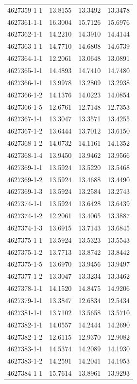\begin{longtable}{lrrr}
4627359-1-1 & 13.8155 & 13.3492 & 13.3478 \\
4627361-1-1 & 16.3004 & 15.7126 & 15.6976 \\
4627362-1-1 & 14.2210 & 14.3910 & 14.4144 \\
4627363-1-1 & 14.7710 & 14.6808 & 14.6739 \\
4627364-1-1 & 12.2061 & 13.0648 & 13.0891 \\
4627365-1-1 & 14.4893 & 14.7410 & 14.7480 \\
4627366-1-1 & 13.9978 & 13.2809 & 13.2938 \\
4627366-1-2 & 14.1376 & 14.0223 & 14.0854 \\
4627366-1-5 & 12.6761 & 12.7148 & 12.7353 \\
4627367-1-1 & 13.3047 & 13.3571 & 13.4255 \\
4627367-1-2 & 13.6444 & 13.7012 & 13.6150 \\
4627368-1-2 & 14.0732 & 14.1161 & 14.1352 \\
4627368-1-4 & 13.9450 & 13.9462 & 13.9566 \\
4627369-1-1 & 13.5924 & 13.5220 & 13.5468 \\
4627369-1-2 & 13.5924 & 13.4688 & 13.4490 \\
4627369-1-3 & 13.5924 & 13.2584 & 13.2743 \\
4627374-1-1 & 13.5924 & 13.6428 & 13.6439 \\
4627374-1-2 & 12.2061 & 13.4065 & 13.3887 \\
4627374-1-3 & 13.6915 & 13.7143 & 13.6845 \\
4627375-1-1 & 13.5924 & 13.5323 & 13.5543 \\
4627375-1-2 & 13.7713 & 13.8742 & 13.8442 \\
4627375-1-5 & 13.6970 & 13.9456 & 13.9497 \\
4627377-1-2 & 13.3047 & 13.3234 & 13.3462 \\
4627378-1-1 & 14.1520 & 14.8475 & 14.9206 \\
4627379-1-1 & 13.3847 & 12.6834 & 12.5434 \\
4627381-1-1 & 13.7102 & 13.5658 & 13.5710 \\
4627382-1-1 & 14.0557 & 14.2444 & 14.2690 \\
4627382-1-2 & 12.6115 & 12.9370 & 12.9082 \\
4627383-1-1 & 14.5374 & 14.2089 & 14.1930 \\
4627383-1-2 & 14.2591 & 14.2041 & 14.1953 \\
4627384-1-1 & 15.7614 & 13.8961 & 13.9293 \\

\end{longtable}
